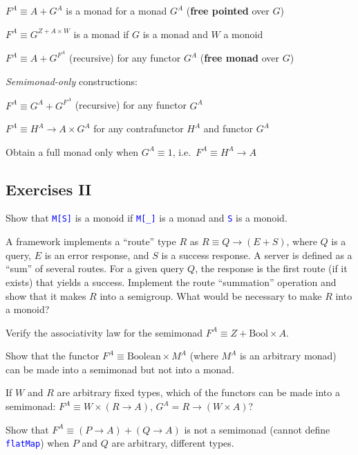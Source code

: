 $F^{A}\equiv A+G^{A}$ is a monad for a monad $G^{A}$ (\textbf{free
pointed} over $G$)

$F^{A}\equiv G^{Z+A\times W}$ is a monad if $G$ is a monad and $W$
a monoid

$F^{A}\equiv A+G^{F^{A}}$ (recursive) for any functor $G^{A}$ (\textbf{free
monad} over $G$)

\emph{Semimonad-only} constructions:

$F^{A}\equiv G^{A}+G^{F^{A}}$ (recursive) for any functor $G^{A}$

$F^{A}\equiv H^{A}\rightarrow A\times G^{A}$ for any contrafunctor
$H^{A}$ and functor $G^{A}$

Obtain a full monad only when $G^{A}\equiv1$, i.e.\ $F^{A}\equiv H^{A}\rightarrow A$


\subsection{Exercises II}

\vspace*{-0.2cm}Show that \texttt{\textcolor{blue}{\footnotesize{}M{[}S{]}}}
is a monoid if \texttt{\textcolor{blue}{\footnotesize{}M{[}\_{]}}}
is a monad and \texttt{\textcolor{blue}{\footnotesize{}S}} is a monoid.

A framework implements a ``route'' type $R$ as $R\equiv Q\rightarrow\left(E+S\right)$,
where $Q$ is a query, $E$ is an error response, and $S$ is a success
response. A server is defined as a ``sum'' of several routes. For
a given query $Q$, the response is the first route (if it exists)
that yields a success. Implement the route ``summation'' operation
and show that it makes $R$ into a semigroup. What would be necessary
to make $R$ into a monoid?

Verify the associativity law for the semimonad $F^{A}\equiv Z+\text{Bool}\times A$.

Show that the functor $F^{A}\equiv\text{Boolean}\times M^{A}$ (where
$M^{A}$ is an arbitrary monad) can be made into a semimonad but not
into a monad.

If $W$ and $R$ are arbitrary fixed types, which of the functors
can be made into a semimonad: $F^{A}\equiv W\times\left(R\rightarrow A\right)$,
$G^{A}=R\rightarrow\left(W\times A\right)$?

Show that $F^{A}\equiv\left(P\rightarrow A\right)+\left(Q\rightarrow A\right)$
is not a semimonad (cannot define \texttt{\textcolor{blue}{\footnotesize{}flatMap}})
when $P$ and $Q$ are arbitrary, different types.

